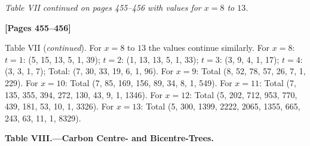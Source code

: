 \documentclass[11pt,a4paper]{article}
\begin{document}
\textit{Table VII continued on pages 455--456 with values for $x = 8$ to $13$.}

\newpage
\textbf{[Pages 455--456]}

Table VII (\textit{continued}). For $x = 8$ to $13$ the values continue similarly.
For $x = 8$: $t = 1$: (5, 15, 13, 5, 1, 39); $t = 2$: (1, 13, 13, 5, 1, 33);
$t = 3$: (3, 9, 4, 1, 17); $t = 4$: (3, 3, 1, 7); Total: (7, 30, 33, 19, 6, 1, 96).
For $x = 9$: Total (8, 52, 78, 57, 26, 7, 1, 229).
For $x = 10$: Total (7, 85, 169, 156, 89, 34, 8, 1, 549).
For $x = 11$: Total (7, 135, 355, 394, 272, 130, 43, 9, 1, 1346).
For $x = 12$: Total (5, 202, 712, 953, 770, 439, 181, 53, 10, 1, 3326).
For $x = 13$: Total (5, 300, 1399, 2222, 2065, 1355, 665, 243, 63, 11, 1, 8329).

\begin{center}
\textbf{Table VIII.---Carbon Centre- and Bicentre-Trees.}
\end{center}
\end{document}
